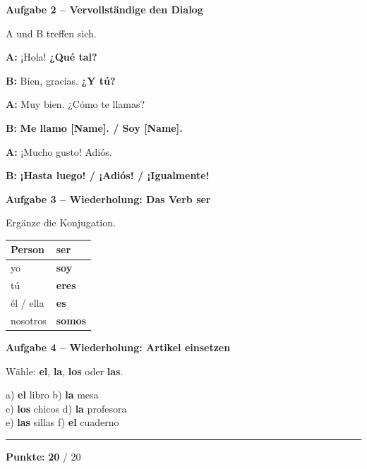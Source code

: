 \documentclass[11pt, a4paper]{article}
\newcommand{\fachfarbe}{spanisch}
\newcommand{\maxpunkte}{20}
\newcommand{\punktebox}[1]{\hfill\fbox{\small \_/#1}}
\newcommand{\lsg}[1]{\textcolor{loesung}{\textbf{#1}}}
\newenvironment{aufgabe}[1]{%
    \needspace{5\baselineskip}%
    \nopagebreak[4]%
    \vspace{10pt}
    \noindent\textbf{\textcolor{\fachfarbe}{Aufgabe #1}}
    \nopagebreak[4]%
    \vspace{5pt}
    \nopagebreak[4]%
    \begin{list}{}{\leftmargin=0pt}
    \item[]
}{%
    \end{list}
}
\newcommand{\es}[1]{\textcolor{\fachfarbe}{\textbf{#1}}}
\begin{document}
\vspace{10pt}

\begin{aufgabe}{2 -- Vervollständige den Dialog}
A und B treffen sich. \punktebox{6}
\end{aufgabe}

\noindent
\textbf{A:} ¡Hola! \lsg{¿Qué tal?}

\vspace{0.8em}

\noindent
\textbf{B:} Bien, gracias. \lsg{¿Y tú?}

\vspace{0.8em}

\noindent
\textbf{A:} Muy bien. ¿Cómo te llamas?

\vspace{0.8em}

\noindent
\textbf{B:} \lsg{Me llamo [Name]. / Soy [Name].}

\vspace{0.8em}

\noindent
\textbf{A:} ¡Mucho gusto! Adiós.

\vspace{0.8em}

\noindent
\textbf{B:} \lsg{¡Hasta luego! / ¡Adiós! / ¡Igualmente!}

\vspace{15pt}

\begin{aufgabe}{3 -- Wiederholung: Das Verb \es{ser}}
Ergänze die Konjugation. \punktebox{4}
\end{aufgabe}

\begin{center}
\begin{tabular}{|l|l|}
\hline
\textbf{Person} & \textbf{ser} \\
\hline
yo & \lsg{soy} \\
\hline
tú & \lsg{eres} \\
\hline
él / ella & \lsg{es} \\
\hline
nosotros & \lsg{somos} \\
\hline
\end{tabular}
\end{center}

\vspace{10pt}

\begin{aufgabe}{4 -- Wiederholung: Artikel einsetzen}
Wähle: \es{el}, \es{la}, \es{los} oder \es{las}. \punktebox{6}
\end{aufgabe}

\noindent
a) \lsg{el} libro \hfill
b) \lsg{la} mesa \\[0.8em]
c) \lsg{los} chicos \hfill
d) \lsg{la} profesora \\[0.8em]
e) \lsg{las} sillas \hfill
f) \lsg{el} cuaderno \\

\vspace{20pt}
\hrule
\vspace{10pt}

\begin{flushright}
\textbf{Punkte:} \lsg{\maxpunkte} / \maxpunkte
\end{flushright}
\end{document}
